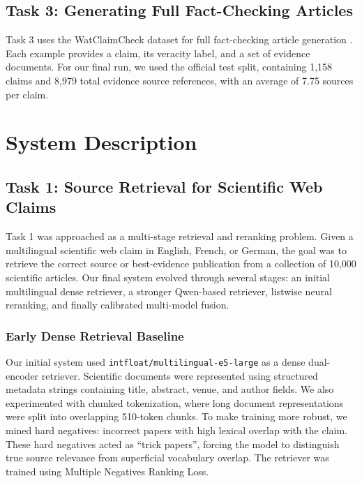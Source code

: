 \documentclass[
]{ceurart}
\begin{document}
\subsection{Task 3: Generating Full Fact-Checking Articles}

Task 3 uses the WatClaimCheck dataset for full fact-checking article generation \cite{clef-checkthat:2026:task3}. Each example provides a claim, its veracity label, and a set of evidence documents. For our final run, we used the official test split, containing 1,158 claims and 8,979 total evidence source references, with an average of 7.75 sources per claim.

\section{System Description}

\subsection{Task 1: Source Retrieval for Scientific Web Claims}

Task 1 was approached as a multi-stage retrieval and reranking problem. Given a multilingual scientific web claim in English, French, or German, the goal was to retrieve the correct source or best-evidence publication from a collection of 10,000 scientific articles. Our final system evolved through several stages: an initial multilingual dense retriever, a stronger Qwen-based retriever, listwise neural reranking, and finally calibrated multi-model fusion.

\subsubsection{Early Dense Retrieval Baseline}

Our initial system used \texttt{intfloat/multilingual-e5-large} as a dense dual-encoder retriever. Scientific documents were represented using structured metadata strings containing title, abstract, venue, and author fields. We also experimented with chunked tokenization, where long document representations were split into overlapping 510-token chunks. To make training more robust, we mined hard negatives: incorrect papers with high lexical overlap with the claim. These hard negatives acted as ``trick papers'', forcing the model to distinguish true source relevance from superficial vocabulary overlap. The retriever was trained using Multiple Negatives Ranking Loss.
\end{document}
